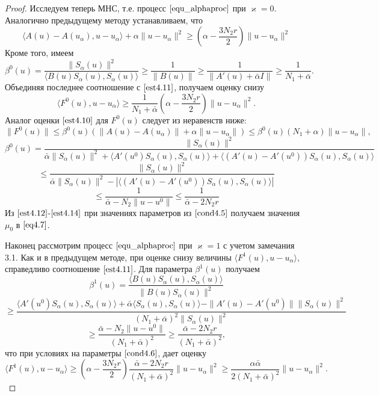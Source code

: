 \begin{proof}
Исследуем теперь МНС, т.е. процесс $\eqref{equ_alphaproc}$ при $\varkappa=0$. Аналогично предыдущему методу устанавливаем, что
\begin{equation}\label{est4.11}
\langle A(u)-A(u_\alpha), u-u_\alpha\rangle+\alpha\|u-u_\alpha\|^2\ge\left(\alpha-\frac{3N_2 r}{2}\right)\|u-u_\alpha\|^2
\end{equation}
Кроме того, имеем
$$\beta^0(u)=\frac{\|S_\alpha(u)\|^2}{\langle B(u)S_\alpha(u), S_\alpha(u)\rangle}\ge\frac{1}{\|B(u)\|}\ge\frac{1}{\|A'(u)+\bar\alpha I\|}\ge\frac{1}{N_1+\bar\alpha}.$$
Объединяя последнее соотношение с $\eqref{est4.11}$, получаем оценку снизу
\begin{equation}\label{est4.12}
\langle F^0(u), u-u_\alpha\rangle\ge\frac{1}{N_1+\bar\alpha}\left (\alpha -\frac{3N_2 r}{2}\right )\|u-u_\alpha\|^2.
\end{equation}
Аналог оценки $\eqref{est4.10}$ для $F^0(u)$ следует из неравенств ниже:
\begin{equation}\label{est4.13}
\|F^0(u)\|\le\beta^0(u)(\|A(u)-A(u_\alpha)\|+\alpha\|u-u_\alpha\|)\le\beta^0(u)(N_1+\alpha)\|u-u_\alpha\|,
\end{equation}
$$\beta^0(u)=\frac{\|S_\alpha(u)\|^2}{\bar\alpha\|S_\alpha(u)\|^2+\langle A'(u^0)S_\alpha(u), S_\alpha(u)\rangle+\langle (A'(u)-A'(u^0))S_\alpha(u), S_\alpha(u)\rangle}$$
$$\le \frac{\|S_\alpha(u)\|^2}{\bar\alpha\|S_\alpha(u)\|^2-|\langle (A'(u)-A'(u^0))S_\alpha(u), S_\alpha(u)\rangle|}$$
\begin{equation}\label{est4.14}
\le\frac{1}{\bar\alpha -N_2\|u-u^0\|}\le\frac{1}{\bar\alpha -2N_2 r}
\end{equation}
Из $\eqref{est4.12}$-$\eqref{est4.14}$ при значениях параметров из $\eqref{cond4.5}$ получаем значения $\mu_0$ в $\eqref{eq4.7}$.

Наконец рассмотрим процесс $\eqref{equ_alphaproc}$ при $\varkappa=1$ с учетом замечания 3.1. Как и в предыдущем методе, при оценке снизу величины $\langle F^1(u), u-u_\alpha\rangle$, справедливо соотношение $\eqref{est4.11}$. Для параметра $\beta^1(u)$ получаем
$$\beta^1(u)=\frac{\langle B(u)S_\alpha(u), S_\alpha(u)\rangle}{\|B(u)S_\alpha(u)\|^2}$$$$\ge\frac{\langle A'(u^0)S_\alpha(u), S_\alpha(u)\rangle+\bar\alpha\langle S_\alpha(u), S_\alpha(u)\rangle-\|A'(u)-A'(u^0)\|\|S_\alpha(u)\|^2}{(N_1+\bar\alpha)^2\|S_\alpha(u)\|^2}$$$$\ge\frac{\bar\alpha -N_2\|u-u^0\|}{(N_1+\bar\alpha)^2}\ge\frac{\bar\alpha -2N_2 r}{(N_1+\bar\alpha)^2},$$
что при условиях на параметры $\eqref{cond4.6}$, дает оценку
\begin{equation}\label{est4.15}
\langle F^1(u), u-u_\alpha\rangle\ge\left (\alpha -\frac{3N_2 r}{2}\right )\frac{\bar\alpha - 2N_2 r}{(N_1+\bar\alpha)^2}\|u-u_\alpha\|^2\ge\frac{\alpha\bar\alpha}{2(N_1+\bar\alpha)^2}\|u-u_\alpha\|^2.
\end{equation}


\end{proof}
